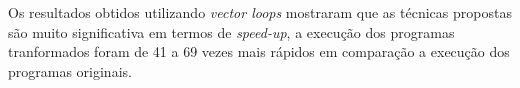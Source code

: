 Os resultados obtidos utilizando \textit{vector loops} mostraram que as técnicas
propostas são muito significativa em termos de \textit{speed-up}, a execução dos 
programas tranformados foram de 41 a 69 vezes mais rápidos em comparação a execução
dos programas originais.





